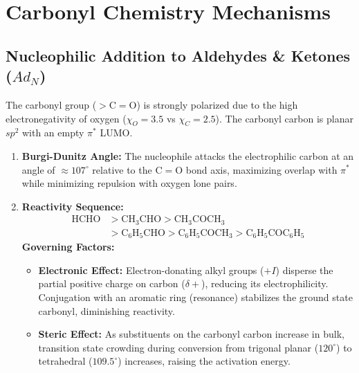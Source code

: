 \documentclass[10pt,twoside,openright]{book}
\begin{document}
\newpage
\section{Carbonyl Chemistry Mechanisms}

\subsection{Nucleophilic Addition to Aldehydes \& Ketones (\texorpdfstring{$Ad_N$}{AdN})}

\begin{conceptbox}
The carbonyl group ($>\mathrm{C=O}$) is strongly polarized due to the high electronegativity of oxygen ($\chi_O = 3.5$ vs $\chi_C = 2.5$). The carbonyl carbon is planar $sp^2$ with an empty $\pi^*$ LUMO.
\begin{enumerate}[leftmargin=*]
  \item \textbf{Burgi-Dunitz Angle:} The nucleophile attacks the electrophilic carbon at an angle of $\approx 107^\circ$ relative to the $\mathrm{C=O}$ bond axis, maximizing overlap with $\pi^*$ while minimizing repulsion with oxygen lone pairs.
  \item \textbf{Reactivity Sequence:}
  \begin{align}
    \mathrm{HCHO} &> \mathrm{CH_3CHO} > \mathrm{CH_3COCH_3} \\
    &> \mathrm{C_6H_5CHO} > \mathrm{C_6H_5COCH_3} > \mathrm{C_6H_5COC_6H_5}
  \end{align}
  \textbf{Governing Factors:}
  \begin{itemize}
    \item \textbf{Electronic Effect:} Electron-donating alkyl groups ($+I$) disperse the partial positive charge on carbon ($\delta+$), reducing its electrophilicity. Conjugation with an aromatic ring (resonance) stabilizes the ground state carbonyl, diminishing reactivity.
    \item \textbf{Steric Effect:} As substituents on the carbonyl carbon increase in bulk, transition state crowding during conversion from trigonal planar ($120^\circ$) to tetrahedral ($109.5^\circ$) increases, raising the activation energy.
  \end{itemize}
\end{enumerate}
\end{conceptbox}
\end{document}
